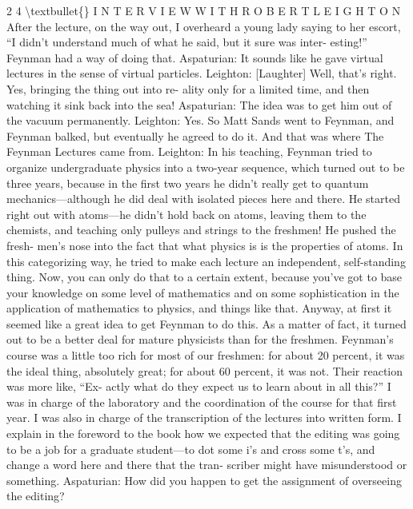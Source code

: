 \documentclass[10pt,oneside]{article}
\begin{document}
2 4 \textbackslash{}textbullet\{\} I N T E R V I E W  W I T H  R O B E R T  L E I G H T O N After the lecture, on the way out, I overheard a young lady saying to her escort, “I didn’t understand much of what he said, but it sure was inter- esting!” Feynman had a way of doing that. Aspaturian: It sounds like he gave virtual lectures in the sense of virtual particles. Leighton: [Laughter] Well, that’s right. Yes, bringing the thing out into re- ality only for a limited time, and then watching it sink back into the sea! Aspaturian: The idea was to get him out of the vacuum permanently. Leighton: Yes. So Matt Sands went to Feynman, and Feynman balked, but eventually he agreed to do it. And that was where The Feynman Lectures came from. Leighton: In his teaching, Feynman tried to organize undergraduate physics into a two-year sequence, which turned out to be three years, because in the first two years he didn’t really get to quantum mechanics---although he did deal with isolated pieces here and there. He started right out with atoms---he didn’t hold back on atoms, leaving them to the chemists, and teaching only pulleys and strings to the freshmen! He pushed the fresh- men’s nose into the fact that what physics is is the properties of atoms. In this categorizing way, he tried to make each lecture an independent, self-standing thing. Now, you can only do that to a certain extent, because you’ve got to base your knowledge on some level of mathematics and on some sophistication in the application of mathematics to physics, and things like that. Anyway, at first it seemed like a great idea to get Feynman to do this. As a matter of fact, it turned out to be a better deal for mature physicists than for the freshmen. Feynman’s course was a little too rich for most of our freshmen: for about 20 percent, it was the ideal thing, absolutely great; for about 60 percent, it was not. Their reaction was more like, “Ex- actly what do they expect us to learn about in all this?” I was in charge of the laboratory and the coordination of the course for that first year. I was also in charge of the transcription of the lectures into written form. I explain in the foreword to the book how we expected that the editing was going to be a job for a graduate student---to dot some i’s and cross some t’s, and change a word here and there that the tran- scriber might have misunderstood or something. Aspaturian: How did you happen to get the assignment of overseeing the editing?\par
\end{document}
